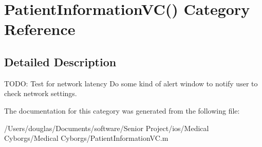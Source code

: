 \hypertarget{category_patient_information_v_c_07_08}{\section{Patient\-Information\-V\-C() Category Reference}
\label{category_patient_information_v_c_07_08}
}


\subsection{Detailed Description}
T\-O\-D\-O\-: Test for network latency Do some kind of alert window to notify user to check network settings. 

The documentation for this category was generated from the following file\-:\begin{DoxyCompactItemize}
\item 
/\-Users/douglas/\-Documents/software/\-Senior Project/ios/\-Medical Cyborgs/\-Medical Cyborgs/Patient\-Information\-V\-C.\-m\end{DoxyCompactItemize}
